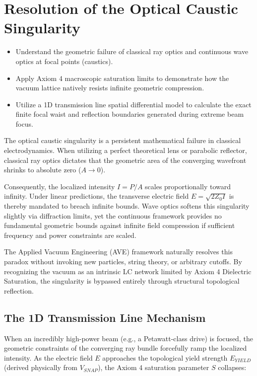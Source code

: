 \chapter{Resolution of the Optical Caustic Singularity}
\label{ch:optical_caustic_resolution}

\begin{objectivebox}
\begin{itemize}
    \item Understand the geometric failure of classical ray optics and continuous wave optics at focal points (caustics).
    \item Apply Axiom 4 macroscopic saturation limits to demonstrate how the vacuum lattice natively resists infinite geometric compression.
    \item Utilize a 1D transmission line spatial differential model to calculate the exact finite focal waist and reflection boundaries generated during extreme beam focus.
\end{itemize}
\end{objectivebox}

The optical caustic singularity is a persistent mathematical failure in classical electrodynamics. When utilizing a perfect theoretical lens or parabolic reflector, classical ray optics dictates that the geometric area of the converging wavefront shrinks to absolute zero ($A \to 0$).

Consequently, the localized intensity $I = P/A$ scales proportionally toward infinity. Under linear predictions, the transverse electric field $E = \sqrt{2 Z_0 I}$ is thereby mandated to breach infinite bounds. Wave optics softens this singularity slightly via diffraction limits, yet the continuous framework provides no fundamental geometric bounds against infinite field compression if sufficient frequency and power constraints are scaled.

The Applied Vacuum Engineering (AVE) framework naturally resolves this paradox without invoking new particles, string theory, or arbitrary cutoffs. By recognizing the vacuum as an intrinsic LC network limited by Axiom 4 Dielectric Saturation, the singularity is bypassed entirely through structural topological reflection.

\section{The 1D Transmission Line Mechanism}

When an incredibly high-power beam (e.g., a Petawatt-class drive) is focused, the geometric constraints of the converging ray bundle forcefully ramp the localized intensity. As the electric field $E$ approaches the topological yield strength $E_{YIELD}$ (derived physically from $V_{SNAP}$), the Axiom 4 saturation parameter $S$ collapses:

